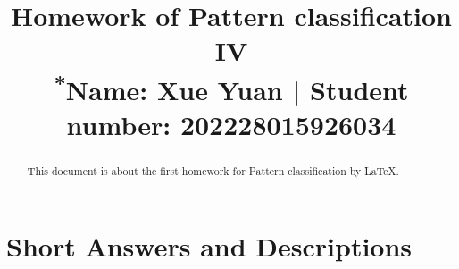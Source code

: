 \documentclass[homework]{IEEEtran}
\begin{document}
\title{Homework of Pattern classification IV\\
{\footnotesize \textsuperscript{*}Name: Xue Yuan  | Student number: 202228015926034}
}

\author{}
\maketitle

\begin{abstract}
This document is about the first homework for Pattern classification by \LaTeX.
\end{abstract}

\section{Short Answers and Descriptions}
\end{document}
